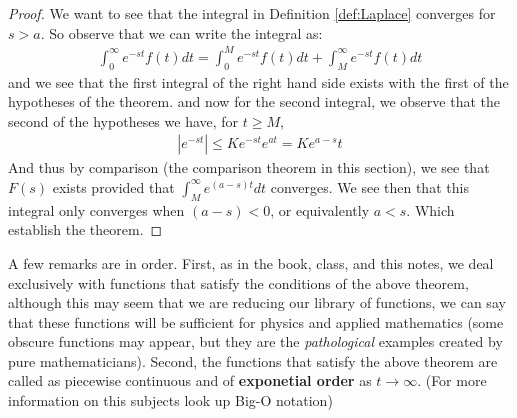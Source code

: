 \begin{proof}
	We want to see that the integral in Definition \ref{def:Laplace} converges for $ s > a$. So observe that we can write the integral as:
	\begin{align}
	\int_0^\infty e^{-st}f(t)dt = \int_0^M e^{-st}f(t)dt + \int_M^\infty e^{-st}f(t)dt
	\end{align}
	and we see that the first integral of the right hand side exists with the first of the hypotheses of the theorem. and now for the second integral, we observe that the second of the hypotheses we have, for $t \geq M$,
	\begin{align*}
	|e^{-st}| \leq Ke^{-st}e^{at} = Ke^{a-s}t
	\end{align*}
	And thus by comparison (the comparison theorem in this section), we see that $F(s)$ exists provided that $ \int_M^{\infty} e^{(a-s)t} dt $ converges. We see then that this integral only converges when $ (a-s) < 0$, or equivalently $a<s$. Which establish the theorem.
\end{proof}
A few remarks are in order. First, as in the book, class, and this notes, we deal exclusively with functions that satisfy the conditions of the above theorem, although this may seem that we are reducing our library of functions, we can say that these functions will be sufficient for physics and applied mathematics (some obscure functions may appear, but they are the \emph{pathological} examples created by pure mathematicians). Second, the functions that satisfy the above theorem are called as piecewise continuous and of \textbf{exponetial order} as $ t \rightarrow \infty$. (For more information on this subjects look up Big-O notation)
